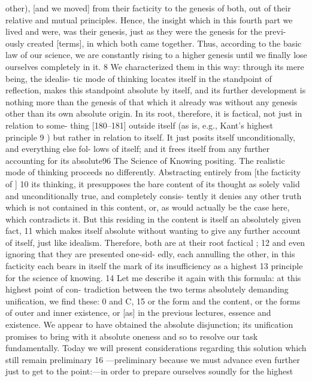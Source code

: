 other), [and we moved] from their facticity to the genesis of both, out of their
relative and mutual principles. Hence, the insight which in this fourth part we
lived and were, was their genesis, just as they were the genesis for the previ-
ously created [terms], in which both came together. Thus, according to the
basic law of our science, we are constantly rising to a higher genesis until we
finally lose ourselves completely in it. 8
We characterized them in this way: through its mere being, the idealis-
tic mode of thinking locates itself in the standpoint of reflection, makes this
standpoint absolute by itself, and its further development is nothing more than
the genesis of that which it already was without any genesis other than its own
absolute origin. In its root, therefore, it is factical, not just in relation to some-
thing [180–181] outside itself (as is, e.g., Kant's highest principle 9 ) but rather
in relation to itself. It just posits itself unconditionally, and everything else fol-
lows of itself; and it frees itself from any further accounting for its absolute96
The Science of Knowing
positing. The realistic mode of thinking proceeds no differently. Abstracting
entirely from [the facticity of ] 10 its thinking, it presupposes the bare content
of its thought as solely valid and unconditionally true, and completely consis-
tently it denies any other truth which is not contained in this content, or, as
would actually be the case here, which contradicts it. But this residing in the
content is itself an absolutely given fact, 11 which makes itself absolute without
wanting to give any further account of itself, just like idealism. Therefore, both
are at their root factical ; 12 and even ignoring that they are presented one-sid-
edly, each annulling the other, in this facticity each bears in itself the mark of
its insufficiency as a highest 13 principle for the science of knowing. 14
Let me describe it again with this formula: at this highest point of con-
tradiction between the two terms absolutely demanding unification, we find
these: 0 and C, 15 or the form and the content, or the forms of outer and inner
existence, or [as] in the previous lectures, essence and existence. We appear to
have obtained the absolute disjunction; its unification promises to bring with
it absolute oneness and so to resolve our task fundamentally.
Today we will present considerations regarding this solution which still
remain preliminary 16 —preliminary because we must advance even further just
to get to the point:—in order to prepare ourselves soundly for the highest
